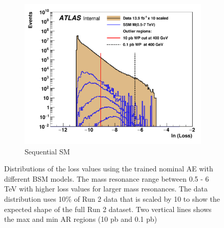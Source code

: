 \begin{figure}[H]
\begin{subfigure}[h]{0.45\linewidth}
    \includegraphics[scale=0.35]{figs/ch6/ar/plot_loss_cut_ssm.pdf}%
    \caption{Sequential SM}
    \end{subfigure}
    \hfill
    \caption{Distributions of the loss values using the trained nominal AE with different BSM models. The mass resonance range between 0.5 - 6 TeV with higher loss values for larger mass resonances. The data distribution uses 10\% of Run 2 data that is scaled by 10 to show the expected shape of the full Run 2 dataset. Two vertical lines shows the max and min AR regions (10 pb and 0.1 pb)}
\label{fig:bsm-loss}
\end{figure}


